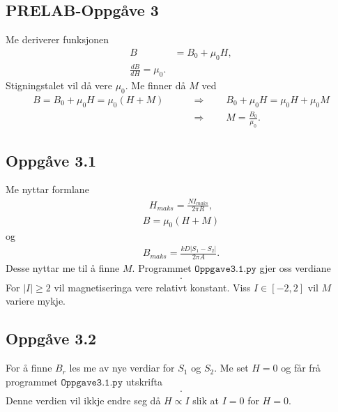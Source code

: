 \documentclass[11pt, a4paper]{article}
\begin{document}
  \subsection*{PRELAB-Oppgåve 3}
    Me deriverer funksjonen
    \begin{align*}
      B &= B_0 + \mu_0H, \\
      \frac{dB}{dH} = \mu_0.
    \end{align*}
    Stigningstalet vil då vere $\mu_0$. Me finner då $M$ ved
    \begin{align*}
      B = B_0 + \mu_0H = \mu_0\left( H + M \right) \qquad &\Rightarrow \qquad B_0 + \mu_0H = \mu_0H + \mu_0M \\
      &\Rightarrow \qquad M = \frac{B_0}{\mu_0}.
    \end{align*}


  \subsection*{Oppgåve 3.1}
      Me nyttar formlane
      \begin{align*}
        H_{maks} = \frac{NI_{maks}}{2\pi R},
      \end{align*}
      \begin{align*}
        B = \mu_0(H + M)
      \end{align*}
      og
      \begin{align*}
        B_{maks} = \frac{kD|S_1 - S_2|}{2\pi A}.
      \end{align*}
      Desse nyttar me til å finne $M$. Programmet $\texttt{Oppgave3.1.py}$ gjer oss verdiane
      \begin{align*}
        .
      \end{align*}
      For $|I| \geq 2$ vil magnetiseringa vere relativt konstant. Viss $I \in [-2, 2]$ vil $M$ variere mykje.






  \subsection*{Oppgåve 3.2}
      For å finne $B_r$ les me av nye verdiar for $S_1$ og $S_2$. Me set $H = 0$ og får frå programmet $\texttt{Oppgave3.1.py}$ utskrifta
      \begin{align*}
        .
      \end{align*}
      Denne verdien vil ikkje endre seg då $H \propto I$ slik at $I = 0$ for $H = 0$.
\end{document}
